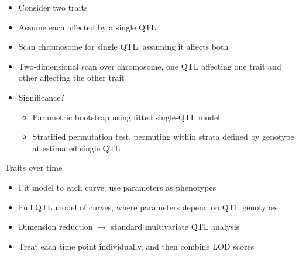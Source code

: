 \documentclass[12pt]{article}
\newcommand{\headsize}{\fontsize{35}{35} \selectfont}
\newcommand{\smallersize}{\fontsize{20}{25} \selectfont}
\begin{document}
\hspace{0.5in} \begin{minipage}{9.5in}

  \begin{itemize}
    \itemsep18pt

  \item Consider two traits
  \item Assume each affected by a single QTL
  \item Scan chromosome for single QTL, assuming it affects both
  \item Two-dimensional scan over chromosome, one QTL affecting one
    trait and other affecting the other trait
  \item Significance?
    {\color{myblue}
    \begin{itemize}
    \item Parametric bootstrap using fitted single-QTL model
    \item Stratified permutation test, permuting within strata
      defined by genotype at estimated single QTL
      \end{itemize} }

  \end{itemize}


\end{minipage}

\newpage

\headsize \color{myyellow}
\hfill \begin{minipage}{5.75in}
\centering
Traits over time
\end{minipage}

\vspace{25mm}

\color{mywhite} \smallersize

\hspace{0.5in} \begin{minipage}{9.5in}

  \begin{itemize}
    \itemsep18pt

  \item Fit model to each curve; use parameters as phenotypes
  \item Full QTL model of curves, where parameters depend on QTL genotypes
  \item Dimension reduction $\rightarrow$ standard multivariate QTL
    analysis
  \item Treat each time point individually, and then combine LOD
    scores
  \end{itemize}

\end{minipage}
\end{document}
